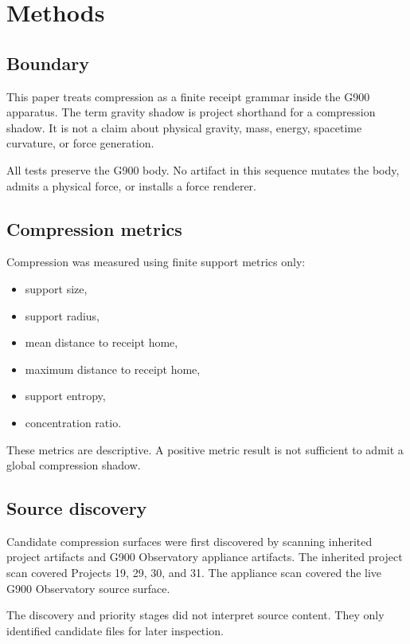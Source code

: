 \section{Methods}

\subsection{Boundary}

This paper treats compression as a finite receipt grammar inside the G900
apparatus. The term gravity shadow is project shorthand for a compression
shadow. It is not a claim about physical gravity, mass, energy, spacetime
curvature, or force generation.

All tests preserve the G900 body. No artifact in this sequence mutates the
body, admits a physical force, or installs a force renderer.

\subsection{Compression metrics}

Compression was measured using finite support metrics only:

\begin{itemize}
  \item support size,
  \item support radius,
  \item mean distance to receipt home,
  \item maximum distance to receipt home,
  \item support entropy,
  \item concentration ratio.
\end{itemize}

These metrics are descriptive. A positive metric result is not sufficient to
admit a global compression shadow.

\subsection{Source discovery}

Candidate compression surfaces were first discovered by scanning inherited
project artifacts and G900 Observatory appliance artifacts. The inherited
project scan covered Projects 19, 29, 30, and 31. The appliance scan covered
the live G900 Observatory source surface.

The discovery and priority stages did not interpret source content. They only
identified candidate files for later inspection.

